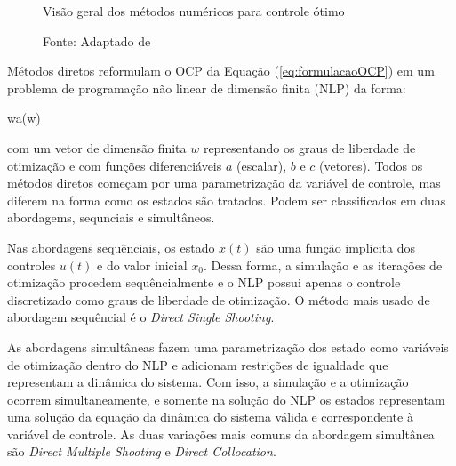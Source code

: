 \begin{figure}[h]
	\centering
	\caption{Visão geral dos métodos numéricos para controle ótimo}
	\label{fig:diagrama_metodos_numericos}
	\caption*{\footnotesize Fonte: Adaptado de \citeauthor{article:Diehl}}
\end{figure}

Métodos diretos reformulam o OCP da Equação (\ref{eq:formulacaoOCP}) em um problema de programação não linear de dimensão finita (NLP) da forma:

\begin{mini!}
	{w}{a(w) \label{eq:NPL1}}
	{\label{eq:NPL}}{}
\end{mini!}

com um vetor de dimensão finita $w$ representando os graus de liberdade de otimização e com funções diferenciáveis $a$ (escalar), $b$ e $c$ (vetores). 
Todos os métodos diretos começam por uma parametrização da variável de controle, mas diferem na forma como os estados são tratados. Podem ser classificados em duas abordagems, sequnciais e simultâneos.\cite{article:Diehl} 

Nas abordagens sequênciais, os estado $x(t)$ são uma função implícita dos controles $u(t)$ e do valor inicial $x_0$. Dessa forma, a simulação
e as iterações de otimização procedem sequêncialmente e o NLP possui apenas o controle discretizado como graus de liberdade de otimização. O método mais usado de abordagem sequêncial é o \textit{Direct Single Shooting}.\cite{article:Diehl}

As abordagens simultâneas fazem uma parametrização dos estado como variáveis de otimização dentro do NLP e adicionam restrições de igualdade que representam a dinâmica do sistema. 
Com isso, a simulação e a otimização ocorrem simultaneamente, e somente na solução do NLP os estados representam uma solução da equação da dinâmica do sistema válida e
correspondente à variável de controle. As duas variações mais comuns da abordagem simultânea são \textit{Direct Multiple Shooting} e \textit{Direct Collocation}.\cite{article:Diehl}

